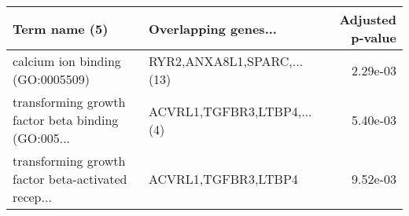 \begin{tabular}{llr}
\toprule
                                     Term name (5) &       Overlapping genes... &  Adjusted p-value \\
\midrule
                  calcium ion binding (GO:0005509) & RYR2,ANXA8L1,SPARC,...(13) &          2.29e-03 \\
transforming growth factor beta binding (GO:005... & ACVRL1,TGFBR3,LTBP4,...(4) &          5.40e-03 \\
transforming growth factor beta-activated recep... &        ACVRL1,TGFBR3,LTBP4 &          9.52e-03 \\
\bottomrule
\end{tabular}
